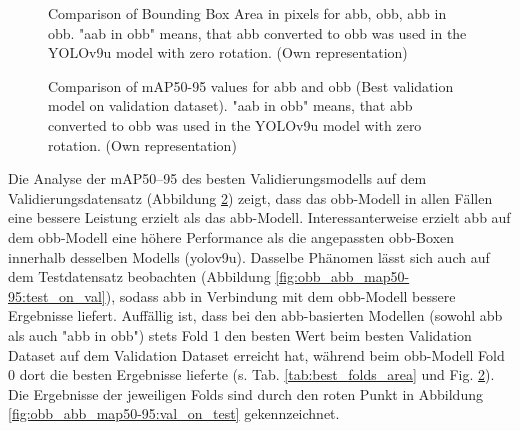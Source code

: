 \begin{figure}[htbp]
    \centering
    
    \caption[Comparison of Bounding Box Area in pixels for \acrshort{abb}, \acrshort{obb}, abb in obb]{Comparison of Bounding Box Area in pixels for \acrshort{abb}, \acrshort{obb}, abb in obb. "aab in obb" means, that \acrlong{abb} converted to obb was used in the \acrshort{YOLO}v9u model with zero rotation. (Own representation)}
    \label{fig:bbox_area}
\end{figure}


\begin{figure}[htbp]
    \centering
    
    \caption[Comparison of \acrshort{mAP}50-95 values for \acrshort{abb} and \acrshort{obb} (Best validation model on validation dataset)]{Comparison of \acrshort{mAP}50-95 values for \acrshort{abb} and \acrshort{obb} (Best validation model on validation dataset). "aab in obb" means, that \acrlong{abb} converted to obb was used in the \acrshort{YOLO}v9u model with zero rotation. (Own representation)}
    \label{fig:obb_abb_map50-95:val_on_val}
\end{figure}
Die Analyse der \acrshort{mAP}50--95 des besten Validierungsmodells auf dem Validierungsdatensatz (Abbildung \ref{fig:obb_abb_map50-95:val_on_val}) zeigt, dass das \acrshort{obb}-Modell in allen Fällen eine bessere Leistung erzielt als das \acrshort{abb}-Modell. Interessanterweise erzielt \acrshort{abb} auf dem \acrshort{obb}-Modell eine höhere Performance als die angepassten \acrshort{obb}-Boxen innerhalb desselben Modells (yolov9u). Dasselbe Phänomen lässt sich auch auf dem Testdatensatz beobachten (Abbildung \ref{fig:obb_abb_map50-95:test_on_val}), sodass \acrshort{abb} in Verbindung mit dem \acrshort{obb}-Modell bessere Ergebnisse liefert. Auffällig ist, dass bei den \acrshort{abb}-basierten Modellen (sowohl \acrshort{abb} als auch "abb in obb") stets Fold 1 den besten Wert beim besten Validation Dataset auf dem Validation Dataset erreicht hat, während beim \acrshort{obb}-Modell Fold 0 dort die besten Ergebnisse lieferte (s. Tab. \ref{tab:best_folds_area} und Fig. \ref{fig:obb_abb_map50-95:val_on_val}). Die Ergebnisse der jeweiligen Folds sind durch den roten Punkt in Abbildung \ref{fig:obb_abb_map50-95:val_on_test} gekennzeichnet. 

